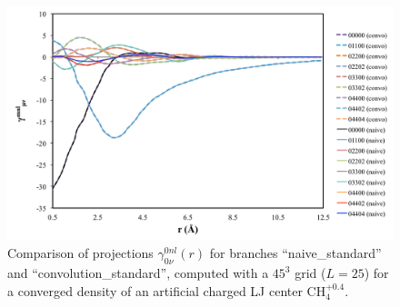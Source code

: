 \begin{figure}[!tbph]
\begin{centering}
\includegraphics[width=0.85\columnwidth]{_figure/results/gamma_proj}
\par\end{centering}
\caption[Comparison of projections $\gamma_{0\nu}^{0nl}(r)$ for branches ``naive\_standard''
and ``convolution\_standard'']{Comparison of projections $\gamma_{0\nu}^{0nl}(r)$ for branches
``naive\_standard'' and ``convolution\_standard'', computed with
a $45^{3}$ grid ($L=25$) for a converged density of an artificial
charged LJ center $\mathrm{CH}_{4}^{+0.4}$.\label{fig:gamma-proj}}

\vspace{0.33cm}


\end{figure}
